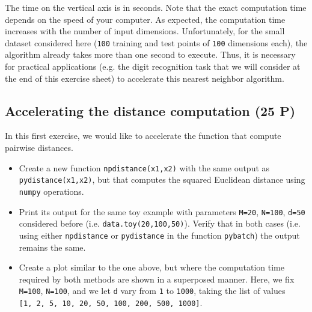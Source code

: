 \documentclass[11pt]{article}
\begin{document}
    The time on the vertical axis is in seconds. Note that the exact
computation time depends on the speed of your computer. As expected, the
computation time increases with the number of input dimensions.
Unfortunately, for the small dataset considered here (\texttt{100}
training and test points of \texttt{100} dimensions each), the algorithm
already takes more than one second to execute. Thus, it is necessary for
practical applications (e.g. the digit recognition task that we will
consider at the end of this exercise sheet) to accelerate this nearest
neighbor algorithm.

    \subsection{Accelerating the distance computation (25
P)}\label{accelerating-the-distance-computation-25-p}

In this first exercise, we would like to accelerate the function that
compute pairwise distances.

\begin{itemize}
\item
  Create a new function \texttt{npdistance(x1,x2)} with the same output
  as \texttt{pydistance(x1,x2)}, but that computes the squared Euclidean
  distance using \texttt{numpy} operations.
\item
  Print its output for the same toy example with parameters
  \texttt{M=20}, \texttt{N=100}, \texttt{d=50} considered before (i.e.
  \texttt{data.toy(20,100,50)}). Verify that in both cases (i.e. using
  either \texttt{npdistance} or \texttt{pydistance} in the function
  \texttt{pybatch}) the output remains the same.
\item
  Create a plot similar to the one above, but where the computation time
  required by both methods are shown in a superposed manner. Here, we
  fix \texttt{M=100}, \texttt{N=100}, and we let \texttt{d} vary from
  \texttt{1} to \texttt{1000}, taking the list of values
  \texttt{{[}1,\ 2,\ 5,\ 10,\ 20,\ 50,\ 100,\ 200,\ 500,\ 1000{]}}.
\end{itemize}
\end{document}
